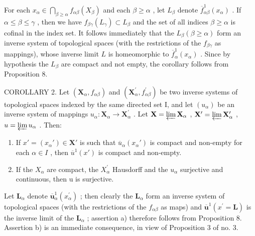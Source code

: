For each \(x_{\alpha} \in \bigcap_{\beta \geqslant \alpha} f_{\alpha \beta}(X_{\beta})\) and each \(\beta \geqslant \alpha\) , let \(L_{\beta}\) denote \(\overline{f}_{\alpha \beta}^{1}(x_{\alpha})\) . If \(\alpha \leqslant \beta \leqslant \gamma\) , then we have \(f_{\beta \gamma}(L_{\gamma}) \subset L_{\beta}\) and the set of all indices \(\beta \geqslant \alpha\) is cofinal in the index set. It follows immediately that the \(L_{\beta} (\beta \geqslant \alpha)\) form an inverse system of topological spaces (with the restrictions of the \(f_{\beta \gamma}\) as mappings), whose inverse limit \(L\) is homeomorphic to \(\overline{f}_{\alpha}^{1}(x_{\alpha})\) . Since by hypothesis the \(L_{\beta}\) are compact and not empty, the corollary follows from Proposition 8.

COROLLARY 2. Let \((\mathbf{X}_{\alpha}, f_{\alpha \beta})\) and \((\mathbf{X}_{\alpha}^{\prime}, f_{\alpha \beta}^{\prime})\) be two inverse systems of topological spaces indexed by the same directed set I, and let \((u_{\alpha})\) be an inverse system of mappings \(u_{\alpha}: \mathbf{X}_{\alpha} \to \mathbf{X}_{\alpha}^{\prime}\) . Let \(\mathbf{X} = \varprojlim \mathbf{X}_{\alpha}\) , \(\mathbf{X}^{\prime} = \varprojlim \mathbf{X}_{\alpha}^{\prime}\) , \(u = \varprojlim u_{\alpha}\) . Then:

\begin{enumerate}
\def\labelenumi{\alph{enumi})}
\item
  If \(x' = (x_{\alpha}') \in \mathbf{X}'\) is such that \(\overline{u}_{\alpha}(x_{\alpha}')\) is compact and non-empty for each \(\alpha \in I\) , then \(\overline{u}^1(x')\) is compact and non-empty.
\item
  If the \(X_{\alpha}\) are compact, the \(X_{\alpha}^{\prime}\) Hausdorff and the \(u_{\alpha}\) surjective and continuous, then u is surjective.
\end{enumerate}

Let \(\mathbf{L}_{\alpha}\) denote \(\overline{\boldsymbol{u}}_{\alpha}^{1}(x_{\alpha}^{\prime})\) ; then clearly the \(\mathbf{L}_{\alpha}\) form an inverse system of topological spaces (with the restrictions of the \(f_{\alpha \beta}\) as maps) and \(\overline{\boldsymbol{u}}^{1}(x^{\prime} = \mathbf{L})\) is the inverse limit of the \(\mathbf{L}_{\alpha}\) ; assertion a) therefore follows from Proposition 8. Assertion b) is an immediate consequence, in view of Proposition 3 of no. 3.

